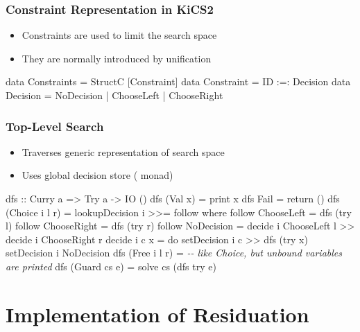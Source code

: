 \documentclass[
,xcolor=dvipsnames
]{beamer}
\newcommand{\comment}[1]{\textsl{-{}- #1}}
\begin{document}
\begin{frame}[fragile]%
\frametitle{Constraint Representation in KiCS2}

\begin{itemize}
\item Constraints are used to limit the search space
\item They are normally introduced by unification
\end{itemize}

\begin{haskell}
data Constraints = StructC [Constraint] \medskip
data Constraint = ID :=: Decision \medskip
data Decision = NoDecision
              | ChooseLeft
              | ChooseRight
\end{haskell}
\end{frame}

\begin{frame}[fragile]%
\frametitle{Top-Level Search}

\begin{itemize}
  \item Traverses generic representation of search space
  \item Uses global decision store ( monad)
\end{itemize}

\begin{haskell}
dfs :: Curry a => Try a -> IO ()
dfs (Val x)        = print x
dfs Fail           = return ()
dfs (Choice i l r) = lookupDecision i >>= follow
  where
  follow ChooseLeft  = dfs (try l)
  follow ChooseRight = dfs (try r)
  follow NoDecision  = decide i ChooseLeft l >> decide i ChooseRight r \medskip
  decide i c x = do setDecision i c >> dfs (try x)
                    setDecision i NoDecision
dfs (Free i l r)   = \comment{like Choice, but unbound variables are printed}
dfs (Guard cs e)   = solve cs (dfs try e)
\end{haskell}
\end{frame}


\section{Implementation of Residuation}
\end{document}

